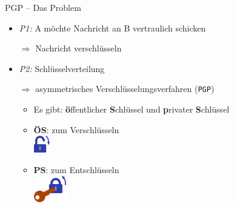 \documentclass{beamer}
\begin{document}

\begin{frame}{PGP – Das Problem}

  \begin{itemize}
   \item \textit{P1:} A möchte Nachricht an B vertraulich schicken\\
   \item[$\Rightarrow$] Nachricht verschlüsseln

   \pause

   \vspace*{.5\baselineskip}

   \item\textit{P2:} Schlüsselverteilung\\
   \item[$\Rightarrow$] asymmetrisches Verschlüsselungsverfahren (\texttt{PGP})
   \begin{itemize}
    \item Es gibt: \textbf{ö}ffentlicher \textbf{S}chlüssel und \textbf{p}rivater \textbf{S}chlüssel

    \pause

    \vspace*{.5\baselineskip}

    \item \textbf{ÖS}: zum Verschlüsseln\\
    {\vspace*{4mm}\hspace{12mm}\includegraphics[width=7mm]{img-src/padlock-lock}}


    \item \textbf{PS}: zum Entschlüsseln\\
    {\vspace*{4mm}\hspace{5mm}\includegraphics[width=14mm]{img-src/padlock-unlock-with-key}}

   \end{itemize}
  \end{itemize}


\end{frame}
\end{document}

